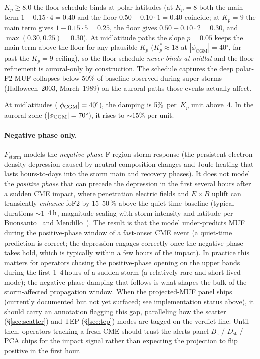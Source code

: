 \documentclass[11pt,a4paper]{article}
\newcommand{\SI}[2]{#1\,\text{#2}}
\newcommand{\hour}{\text{h}}
\newcommand{\degree}{\ensuremath{{}^\circ}}
\begin{document}
$K_p \ge 8.0$ the floor schedule binds at polar latitudes
(at $K_p = 8$ both the main term $1 - 0.15 \cdot 4 = 0.40$ and
the floor $0.50 - 0.10 \cdot 1 = 0.40$ coincide; at $K_p = 9$
the main term gives $1 - 0.15 \cdot 5 = 0.25$, the floor gives
$0.50 - 0.10 \cdot 2 = 0.30$, and $\max(0.30, 0.25) = 0.30$).  At midlatitude paths the slope
$p = 0.05$ keeps the main term above the floor for any
plausible $K_p$ ($K_p^{*} \approx 18$ at $|\phi_{\text{CGM}}|
= 40\degree$, far past the $K_p = 9$ ceiling), so the floor
schedule \emph{never binds at midlat} and the floor refinement
is auroral-only by construction.  The schedule captures the deep
polar-F2-MUF collapses below 50\% of baseline observed during
super-storms (Halloween~2003, March~1989) on the auroral paths
those events actually affect.

At midlatitudes ($|\phi_{\text{CGM}}| = 40\text{\textdegree}$), the
damping is 5\%~per~$K_p$ unit above~4.  In the auroral zone
($|\phi_{\text{CGM}}| = 70\text{\textdegree}$), it rises to
${\sim}15$\% per unit.

\paragraph{Negative phase only.}  $F_{\text{storm}}$ models the
\emph{negative-phase} F-region storm response (the persistent
electron-density depression caused by neutral composition changes
and Joule heating that lasts hours-to-days into the storm main and
recovery phases).  It does not model the \emph{positive
phase} that can precede the depression in the first several hours
after a sudden CME impact, where penetration electric fields and
$E\times B$ uplift can transiently \emph{enhance} foF2 by
15--50\,\% above the quiet-time baseline (typical durations
${\sim}\!1$--$\SI{4}{\hour}$, magnitude scaling with storm
intensity and latitude per
Buonsanto~\cite{buonsanto1999} and Mendillo~\cite{mendillo2006}).  The result is that the model
under-predicts MUF during the positive-phase window of a
fast-onset CME event (a quiet-time prediction is correct; the
depression engages correctly once the negative phase takes hold,
which is typically within a few hours of the impact).  In
practice this matters for operators chasing the positive-phase
opening on the upper bands during the first 1--4\,hours of a
sudden storm (a relatively rare and short-lived mode); the
negative-phase damping that follows is what shapes the bulk of
the storm-affected propagation window.  When the
projected-MUF panel ships (currently documented but not yet
surfaced; see implementation status above), it should carry an
annotation flagging this gap, paralleling how the scatter
(\S\ref{sec:scatter}) and TEP (\S\ref{sec:tep}) modes are tagged on
the verdict line.  Until then, operators tracking a fresh CME
should trust the alerts-panel $B_z$ / $D_{\text{st}}$ / PCA chips
for the impact signal rather than expecting the projection to flip
positive in the first hour.
\end{document}
